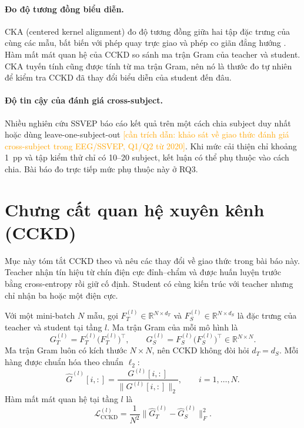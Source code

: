 \documentclass[10pt]{article} %
\newcommand{\cantrich}[1]{\textcolor{orange}{[cần trích dẫn: #1]}}
\begin{document}
\paragraph{Đo độ tương đồng biểu diễn.} CKA (centered kernel alignment) đo độ tương đồng giữa hai tập đặc trưng của cùng các mẫu, bất biến với phép quay trực giao và phép co giãn đẳng hướng \citep{kornblith2019similarity}. Hàm mất mát quan hệ của CCKD so sánh ma trận Gram của teacher và student. CKA tuyến tính cũng được tính từ ma trận Gram, nên nó là thước đo tự nhiên để kiểm tra CCKD đã thay đổi biểu diễn của student đến đâu.

\paragraph{Độ tin cậy của đánh giá cross-subject.} Nhiều nghiên cứu SSVEP báo cáo kết quả trên một cách chia subject duy nhất hoặc dùng leave-one-subject-out \cantrich{khảo sát về giao thức đánh giá cross-subject trong EEG/SSVEP, Q1/Q2 từ 2020}. Khi mức cải thiện chỉ khoảng 1~pp và tập kiểm thử chỉ có 10--20 subject, kết luận có thể phụ thuộc vào cách chia. Bài báo đo trực tiếp mức phụ thuộc này ở RQ3.

\section{Chưng cất quan hệ xuyên kênh (CCKD)}
\label{sec:method}

Mục này tóm tắt CCKD theo \citet{icera2026cckd} và nêu các thay đổi về giao thức trong bài báo này. Teacher nhận tín hiệu từ chín điện cực đỉnh--chẩm và được huấn luyện trước bằng cross-entropy rồi giữ cố định. Student có cùng kiến trúc với teacher nhưng chỉ nhận ba hoặc một điện cực.

Với một mini-batch $N$ mẫu, gọi $F_T^{(l)} \in \mathbb{R}^{N \times d_T}$ và $F_S^{(l)} \in \mathbb{R}^{N \times d_S}$ là đặc trưng của teacher và student tại tầng $l$. Ma trận Gram của mỗi mô hình là
\begin{equation}
G_{T}^{(l)} = F_{T}^{(l)} \bigl(F_{T}^{(l)}\bigr)^{\top}, \qquad
G_{S}^{(l)} = F_{S}^{(l)} \bigl(F_{S}^{(l)}\bigr)^{\top} \in \mathbb{R}^{N \times N}.
\label{eq:gram}
\end{equation}
Ma trận Gram luôn có kích thước $N \times N$, nên CCKD không đòi hỏi $d_T = d_S$. Mỗi hàng được chuẩn hóa theo chuẩn $\ell_2$:
\begin{equation}
\hat{G}^{(l)}[i,:] = \frac{G^{(l)}[i,:]}{\lVert G^{(l)}[i,:] \rVert_2}, \qquad i = 1, \dots, N.
\label{eq:norm}
\end{equation}
Hàm mất mát quan hệ tại tầng $l$ là
\begin{equation}
\mathcal{L}_{\text{CCKD}}^{(l)} = \frac{1}{N^2} \bigl\lVert \hat{G}_{T}^{(l)} - \hat{G}_{S}^{(l)} \bigr\rVert_F^2 .
\label{eq:relloss}
\end{equation}
\end{document}
